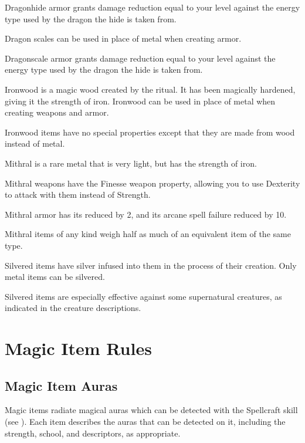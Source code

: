             Dragonhide armor grants damage reduction equal to your level against the energy type used by the dragon the hide is taken from.


            Dragon scales can be used in place of metal when creating armor.

            Dragonscale armor grants damage reduction equal to your level against the energy type used by the dragon the hide is taken from.

            Ironwood is a magic wood created by the  ritual.
            It has been magically hardened, giving it the strength of iron.
            Ironwood can be used in place of metal when creating weapons and armor.

            Ironwood items have no special properties except that they are made from wood instead of metal.

            Mithral is a rare metal that is very light, but has the strength of iron.

            Mithral weapons have the Finesse weapon property, allowing you to use Dexterity to attack with them instead of Strength.

            Mithral armor has its  reduced by 2, and its arcane spell failure reduced by 10.

            Mithral items of any kind weigh half as much of an equivalent item of the same type.


            Silvered items have silver infused into them in the process of their creation.
            Only metal items can be silvered.

            Silvered items are especially effective against some supernatural creatures, as indicated in the creature descriptions.

    \section{Magic Item Rules}

        \subsection{Magic Item Auras}

            Magic items radiate magical auras which can be detected with the Spellcraft skill (see ).
            Each item describes the auras that can be detected on it, including the strength, school, and descriptors, as appropriate.


